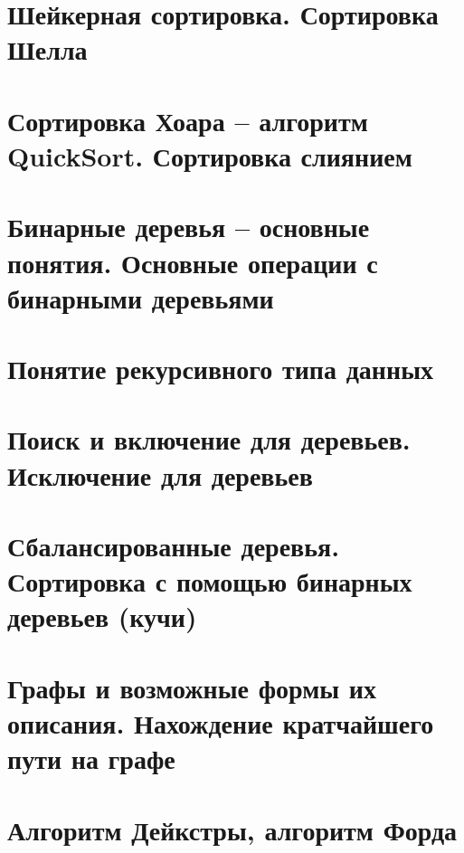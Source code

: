 \section{Шейкерная сортировка. Сортировка Шелла}
\section{Сортировка Хоара – алгоритм QuickSort. Сортировка слиянием}
\section{Бинарные деревья – основные понятия. Основные операции с бинарными деревьями}
\section{Понятие рекурсивного типа данных}
\section{Поиск и включение для деревьев. Исключение для деревьев}
\section{Сбалансированные деревья. Сортировка с помощью бинарных деревьев (кучи)}
\section{Графы и возможные формы их описания. Нахождение кратчайшего пути на графе}
\section{Алгоритм Дейкстры, алгоритм Форда}
